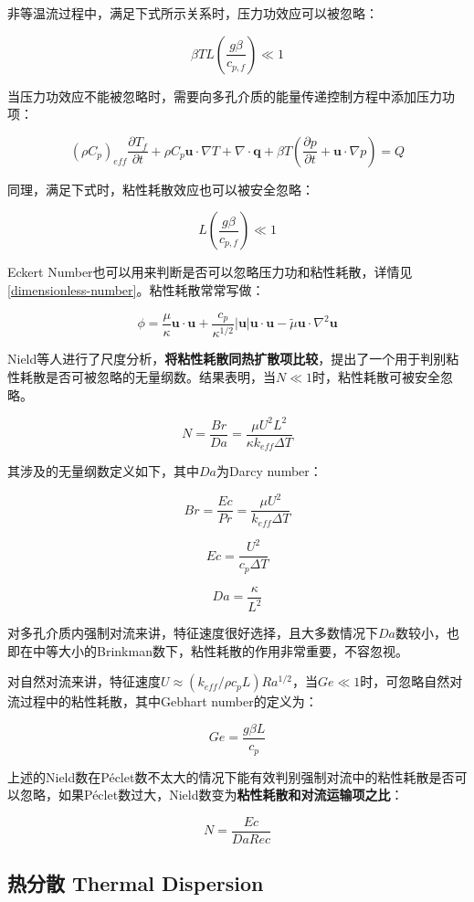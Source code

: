 非等温流过程中，满足下式所示关系时，压力功效应可以被忽略：

\begin{equation}
\beta TL\left(\frac{g\beta}{c_{p,f}}\right) \ll 1
\end{equation}

当压力功效应不能被忽略时，需要向多孔介质的能量传递控制方程中添加压力功项：

\begin{equation}
(\rho C_p)_{eff} \frac{\partial T_f}{\partial t} + \rho C_p\bm{u}\cdot\nabla T + \nabla\cdot\bm{q} + \boxed{\beta T \left(\frac{\partial p}{\partial t}+\bm{u}\cdot\nabla p\right)} = Q
\end{equation}

同理，满足下式时，粘性耗散效应也可以被安全忽略：

\begin{equation}
L \left( \frac{g\beta}{c_{p,f}} \right) \ll 1
\end{equation}

Eckert Number也可以用来判断是否可以忽略压力功和粘性耗散，详情见\autoref{dimensionless-number}。粘性耗散常常写做：

\begin{equation}
\phi = \frac{\mu}{\kappa}\bm{u\cdot u} + \frac{c_p}{\kappa^{1/2}}|\bm{u}|\bm{u\cdot u} - \tilde{\mu}\bm{u}\cdot\nabla^2\bm{u}
\end{equation}

Nield等人进行了尺度分析，\textbf{将粘性耗散同热扩散项比较}，提出了一个用于判别粘性耗散是否可被忽略的无量纲数。结果表明，当$ N\ll 1 $时，粘性耗散可被安全忽略。

\begin{equation}\label{Nield}
N = \frac{Br}{Da} = \frac{\mu U^2 L^2}{\kappa k_{eff}\Delta T}
\end{equation}

其涉及的无量纲数定义如下，其中$ Da $为Darcy number：

\[Br = \frac{Ec}{Pr} = \frac{\mu U^2}{k_{eff}\Delta T}\]

\[ Ec = \frac{U^2}{c_p \Delta T} \]

\[ Da = \frac{\kappa}{L^2} \]

对多孔介质内强制对流来讲，特征速度很好选择，且大多数情况下$ Da $数较小，也即在中等大小的Brinkman数下，粘性耗散的作用非常重要，不容忽视。

对自然对流来讲，特征速度$ U\approx (k_{eff}/\rho c_p L)Ra^{1/2} $，当$ Ge \ll 1 $时，可忽略自然对流过程中的粘性耗散，其中Gebhart number的定义为：

\[ Ge = \frac{g\beta L}{c_p} \]

上述的Nield数在P\'{e}clet数不太大的情况下能有效判别强制对流中的粘性耗散是否可以忽略，如果P\'{e}clet数过大，Nield数变为\textbf{粘性耗散和对流运输项之比}：

\[N = \frac{Ec}{DaRec}\]

\subsection{热分散 Thermal Dispersion}



